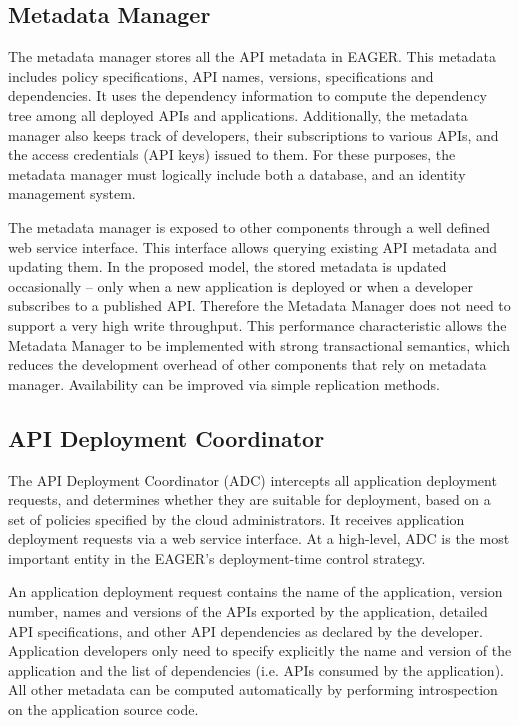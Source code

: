 \subsection{Metadata Manager}
The metadata manager stores all the API metadata in EAGER. This metadata 
includes policy specifications,  API names, versions, specifications and 
dependencies.
It uses the dependency information to compute the dependency tree 
among 
all deployed APIs and applications. Additionally, the metadata manager
also keeps track of developers, their subscriptions to various APIs, 
and the access credentials (API keys) issued to them. 
For these purposes,
the metadata manager must logically include both a database,
and an identity management system.

The metadata manager is exposed to other components through a well defined web service interface.
This interface allows querying existing API metadata and updating them. In the proposed model, the stored metadata is updated 
occasionally -- only when a new application is deployed or when a developer subscribes to a published API. 
Therefore the Metadata Manager
does not need to support a very high write throughput. This performance
characteristic allows the Metadata Manager to be implemented with strong 
transactional semantics,
which reduces the development overhead of other components that rely on metadata manager. 
Availability can be improved via simple replication methods.

\subsection{API Deployment Coordinator} 
\label{sec:adc}
The API Deployment Coordinator (ADC)
intercepts all application deployment requests, and determines whether they are
suitable for deployment, based on a set of policies specified by the cloud
administrators. It receives application deployment requests via a web service
interface. At a high-level, ADC is the most important entity in the EAGER's deployment-time
control strategy.

An application deployment request contains the name of the application,
version number, names and versions of the APIs exported by the application,
detailed API specifications, and other API dependencies as declared by the
developer. Application developers only need to specify explicitly the name and
version of the application and the list of dependencies (i.e. APIs consumed by
the application). All other metadata can be computed automatically by
performing introspection on the application source code. 

